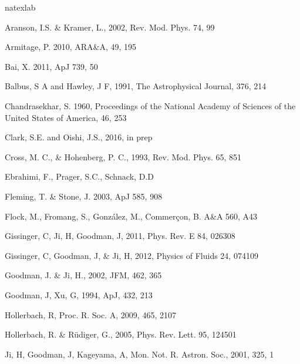 \documentclass{emulateapj}
\begin{document}
\begin{thebibliography}{53}
\expandafter\ifx\csname natexlab\endcsname\relax\def\natexlab#1{#1}\fi

Aranson, I.S. \& Kramer, L., 2002, Rev. Mod. Phys. 74, 99

Armitage, P. 2010, ARA\&A, 49, 195

Bai, X. 2011, ApJ 739, 50

Balbus, S A and Hawley, J F, 1991, The Astrophysical Journal, 376, 214

Chandrasekhar, S. 1960, Proceedings of the National Academy of Sciences of the United States of America, 46, 253

Clark, S.E. and Oishi, J.S., 2016, in prep

Cross, M. C., \& Hohenberg, P. C., 1993, Rev. Mod. Phys. 65, 851

Ebrahimi, F., Prager, S.C., Schnack, D.D

Fleming, T. \& Stone, J. 2003, ApJ 585, 908

Flock, M., Fromang, S., Gonz\'alez, M., Commer\c{c}on, B. A\&A 560, A43

Gissinger, C, Ji, H, Goodman, J, 2011, Phys. Rev. E 84, 026308

Gissinger, C, Goodman, J, \& Ji, H, 2012, Physics of Fluids 24, 074109

Goodman, J. \& Ji, H., 2002, JFM, 462, 365

Goodman, J, Xu, G, 1994, ApJ, 432, 213

Hollerbach, R, Proc. R. Soc. A, 2009, 465, 2107

Hollerbach, R. \& R\"udiger, G., 2005, Phys. Rev. Lett. 95, 124501

Ji, H, Goodman, J, Kageyama, A, Mon. Not. R. Astron. Soc., 2001, 325, 1


\end{thebibliography}
\end{document}
